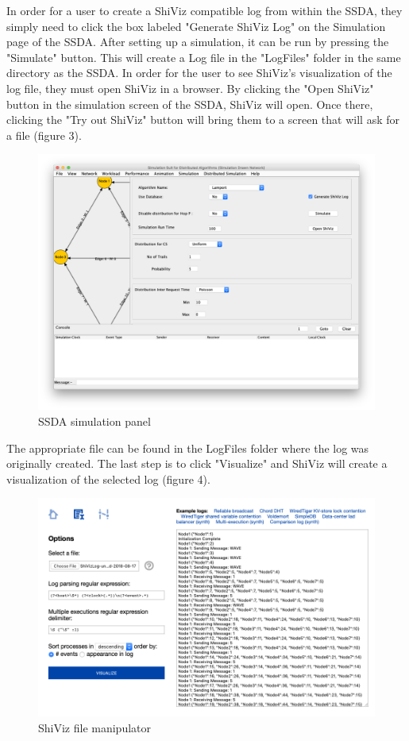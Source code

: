 \documentclass[12pt, oneside]{article}   	%
\begin{document}
In order for a user to create a ShiViz compatible log from within the SSDA, they simply need to click the box labeled "Generate ShiViz Log" on the Simulation page of the SSDA.  After setting up a simulation, it can be run by pressing the "Simulate" button.  This will create a Log file in the "LogFiles" folder in the same directory as the SSDA.  In order for the user to see ShiViz's visualization of the log file, they must open ShiViz in a browser.  By clicking the "Open ShiViz" button in the simulation screen of the SSDA, ShiViz will open.  Once there, clicking the "Try out ShiViz" button will bring them to a screen that will ask for a file (figure 3).
\begin{figure}[t!]
\caption{SSDA simulation panel \cite{SSDA}}
\includegraphics[scale=0.3]{SSDA_Sim_Window.png} 
\centering
\end{figure}
The appropriate file can be found in the LogFiles folder where the log was originally created.  The last step is to click "Visualize" and ShiViz will create a visualization of the selected log (figure 4).
\begin{figure}[t!]
\caption{ShiViz file manipulator \cite{ShiViz}}
\includegraphics[scale=0.5]{ShiViz_File.png} 
\centering
\end{figure}
\end{document}
